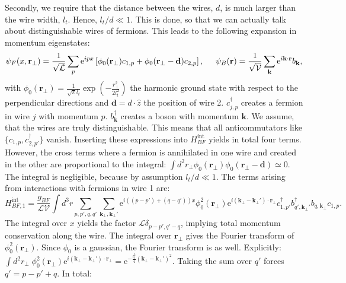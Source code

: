 Secondly, we require that the distance between the wires, $d$, is much larger than the wire width, $l_t$. Hence, $l_t/d \ll 1$. This is done, so that we can actually talk about distinguishable wires of fermions. This leads to the following expansion in momentum eigenstates:
\begin{equation}
\psi_F(x,\mathbf{r}_\perp) = \frac{1}{\sqrt{\mathcal{L}}}\sum_p \text{e}^{ipx} \left[\phi_0(\mathbf{r}_\perp) c_{1,p} + \phi_0(\mathbf{r}_\perp - \mathbf{d}) c_{2,p}\right], \hspace{0.5cm} \psi_B(\mathbf{r}) = \frac{1}{\sqrt{\mathcal{V}}}\sum_{\mathbf{k}} \text{e}^{i\mathbf{k}\cdot \mathbf{r}} b_\mathbf{k}, 
\end{equation}  
with $\phi_0(\mathbf{r}_\perp) = \frac{1}{\sqrt{\pi}l_t}\exp\left(-\frac{r_\perp^2}{2l_t^2}\right)$ the harmonic ground state with respect to the perpendicular directions and $\mathbf{d} = d\cdot\hat{z}$ the position of wire 2. $c^\dagger_{j,p}$ creates a fermion in wire $j$ with momentum $p$. $b^\dagger_\mathbf{k}$ creates a boson with momentum $\mathbf{k}$.  We assume, that the wires are truly distinguishable. This means that all anticommutators like $\{c_{1,p}, c^\dagger_{2,p'}\}$ vanish. Inserting these expressions into $H_{BF}^\text{int}$ yields in total four terms. However, the cross terms where a fermion is annihilated in one wire and created in the other are proportional to the integral: $\int d^2 r_\perp \phi_0(\mathbf{r}_\perp)\phi_0(\mathbf{r}_\perp-\mathbf{d}) \simeq 0$. The integral is negligible, because by assumption $l_t/d \ll 1$. The terms arising from interactions with fermions in wire 1 are:
\begin{equation}
H_{BF, 1}^{\text{int}} = \frac{g_{BF}}{\mathcal{LV}}\int d^3 r \sum_{p,p',q,q'}\sum_{\mathbf{k}_{\perp},\mathbf{k}_{\perp}'}\text{e}^{i((p-p')+(q-q'))x} \phi^2_0(\mathbf{r}_{\perp})\text{e}^{i(\mathbf{k}_{\perp} - \mathbf{k}_{\perp}')\cdot \mathbf{r}_\perp} c^\dagger_{1,p'} b^\dagger_{q',\mathbf{k}_\perp'}b_{q,\mathbf{k}_\perp}c_{1,p}. \nonumber
\end{equation}
The integral over $x$ yields the factor $\mathcal{L}\delta_{p-p',q'-q}$, implying total momentum conservation along the wire. The integral over $\mathbf{r}_\perp$ gives the Fourier transform of $\phi_0^2(\mathbf{r}_\perp)$. Since $\phi_0$ is a gaussian, the Fourier transform is as well. Explicitly: $\int d^2 r_\perp \; \phi^2_0(\mathbf{r}_{\perp})\text{e}^{i(\mathbf{k}_{\perp}-\mathbf{k}_{\perp}')\cdot \mathbf{r}_\perp} = \text{e}^{-\frac{l_t^2}{4}(\mathbf{k}_{\perp}-\mathbf{k}_{\perp}')^2}$. Taking the sum over $q'$ forces $q' = p - p' + q$. In total:
